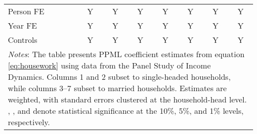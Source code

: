 {\begin{tabular}{l*{7}{c}}
Person FE           &           Y         &           Y         &           Y         &           Y         &           Y         &           Y         &           Y         \\
Year FE             &           Y         &           Y         &           Y         &           Y         &           Y         &           Y         &           Y         \\
Controls            &           Y         &           Y         &           Y         &           Y         &           Y         &           Y         &           Y         \\
\bottomrule
\multicolumn{8}{p{16cm}}{\footnotesize \textit{Notes}: The table presents PPML coefficient estimates from equation \ref{eq:housework} using data from the Panel Study of Income Dynamics. Columns 1 and 2 subset to single-headed households, while columns 3--7 subset to married households. Estimates are weighted, with standard errors clustered at the household-head level. \sym{*}, \sym{**}, and \sym{***} denote statistical significance at the 10\%, 5\%, and 1\% levels, respectively.}\\
\end{tabular}
}
